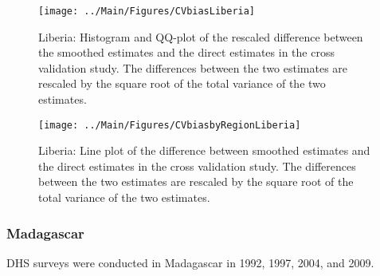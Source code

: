 \documentclass[12pt]{article}\usepackage[]{graphicx}\usepackage[]{color}
\newenvironment{knitrout}{}{} %
\begin{document}
\begin{knitrout}
\color{fgcolor}\begin{figure}[bht]

{\centering \texttt{[image: ../Main/Figures/CVbiasLiberia]} 

}

\caption[Liberia]{Liberia: Histogram and QQ-plot of the rescaled difference between the smoothed estimates and the direct estimates in the cross validation study. The differences between the two estimates are rescaled by the square root of the total variance of the two estimates.}\label{fig:unnamed-chunk-189}
\end{figure}


\end{knitrout}

\begin{knitrout}
\color{fgcolor}\begin{figure}[bht]

{\centering \texttt{[image: ../Main/Figures/CVbiasbyRegionLiberia]} 

}

\caption[Liberia]{Liberia: Line plot of the difference between smoothed estimates and the direct estimates in the cross validation study. The differences between the two estimates are rescaled by the square root of the total variance of the two estimates.}\label{fig:unnamed-chunk-190}
\end{figure}


\end{knitrout}


\clearpage
\subsubsection{Madagascar}





DHS surveys were conducted in Madagascar in 1992, 1997, 2004, and 2009.
\end{document}
